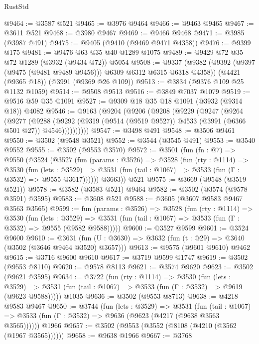 \begin{lexlean}{RustStd}
\begin{coremodule}
@9464 := @3587 @521
@9465 := @3976 @9464
@9466 := @9463 @9465
@9467 := @3611 @521
@9468 := @3980 @9467
@9469 := @9466 @9468
@9471 := @3985 (@3987 @491)
@9475 := @9405 (@9410 (@9469 @9471 @4358))
@9476 := @9399 @175
@9481 := @9476 @63 @35 @40 @1289 @1075
@9489 := @9429 @72 @35 @72 @1289 (@3932 (@9434 @72)) @5054
@9508 := @9337
    (@9382 (@9392 (@9397 (@9475 (@9481 @9489 @9456))) @6309 @6312 @6315 @6318 @4358))
    (@4421 (@9365 @18))
    (@3991 (@9369 @26 @109))
@9513 := @3834 (@9376 @109 @25 @1132 @1059)
@9514 := @9508 @9513
@9516 := @3849 @7037 @1079
@9519 := @9516 @59 @35 @1091
@9527 := @9309 @18 @35 @18 @1091 (@3932 (@9314 @18)) @4082
@9546 := @9163
    (@9204
      (@9206
        (@9208
          (@9229
            (@9247
              (@9264
                (@9277
                  (@9288
                    (@9292
                      (@9319 (@9514 (@9519 @9527)) @4533 (@3991 (@6366 @501 @27)) @4546))))))))))
@9547 := @3498 @491
@9548 := @3506 @9461
@9550 := @3502 (@9548 @3521)
@9552 := @3544 (@3545 @491)
@9553 := @3540 @9552
@9555 := @3502 (@9553 @3570)
@9572 := @3501
    (fun (fn : @7) =>
    @9550
      (@3524
        (@3527
          (fun (params : @3526) =>
          @3528
            (fun (rty : @1114) =>
            @3530
              (fun (lets : @3529) =>
              @3531 (fun (tail : @1067) => @3533 (fun (Γ : @3532) => @9555 @3617))))))
        @3663))
    @521
@9575 := @3669 (@9548 (@3519 @521))
@9578 := @3582 (@3583 @521) @9464
@9582 := @3502 (@3574 (@9578 @3591) @3595)
@9583 := @3608 @521
@9588 := @3605 (@3607 @9583 @9467 @3563 @3565)
@9599 := fun (params : @3526) =>
  @3528
    (fun (rty : @1114) =>
    @3530
      (fun (lets : @3529) =>
      @3531 (fun (tail : @1067) => @3533 (fun (Γ : @3532) => @9555 (@9582 @9588)))))
@9600 := @3527 @9599
@9601 := @3524 @9600
@9610 := @3631 (fun (U : @3630) => @3632 (fun (t : @29) => @3640 (@3502 (@3646 @9464 @3520) @3657)))
@9613 := @9575 (@9601 @9610) @9462
@9615 := @3716 @9600 @9610
@9617 := @3719 @9599 @1747
@9619 := @3502 (@9553 @8110)
@9620 := @9578 @8113
@9621 := @3574 @9620
@9623 := @3502 (@9621 @3595)
@9634 := @3722
    (fun (rty : @1114) =>
    @3530
      (fun (lets : @3529) =>
      @3531 (fun (tail : @1067) => @3533 (fun (Γ : @3532) => @9619 (@9623 @9588)))))
    @1035
@9636 := @3502 (@9553 @8713)
@9638 := @4218 @9583 @9467
@9650 := @3744
    (fun (lets : @3529) =>
    @3531
      (fun (tail : @1067) => @3533 (fun (Γ : @3532) => @9636 (@9623 (@4217 (@9638 @3563 @3565))))))
    @1966
@9657 := @3502 (@9553 (@3552 (@8108 (@4210 (@3562 (@1967 @3565))))))
@9658 := @9638 @1966
@9667 := @3768

\end{coremodule}
\end{lexlean}
